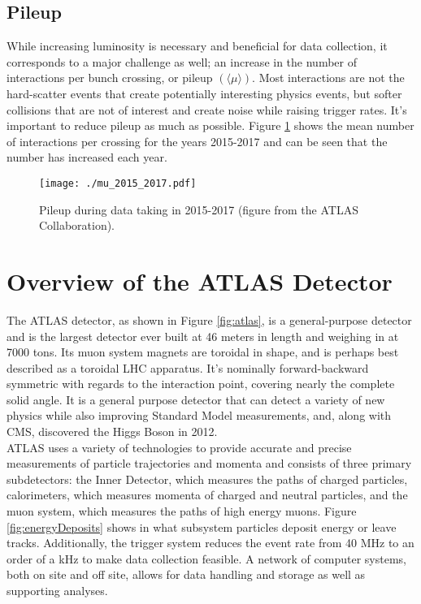
\subsection{Pileup}

While increasing luminosity is necessary and beneficial for data collection, it corresponds to a major challenge as well; an increase in the number of interactions per bunch crossing, or pileup $(\langle \mu \rangle)$.  Most interactions are not the hard-scatter events that create potentially interesting physics events, but softer collisions that are not of interest and create noise while raising trigger rates.  It's important to reduce pileup as much as possible. Figure \ref{fig:mu} shows the mean number of interactions per crossing for the years 2015-2017 and can be seen that the number has increased each year. \\%

\begin{figure}[h!]
  \centering
	\texttt{[image: ./mu\_2015\_2017.pdf]}
\caption[Pileup during data taking in 2015-2017]{\label{fig:mu}{Pileup during data taking in 2015-2017 (figure from the ATLAS Collaboration). }} %
\end{figure}

\section{Overview of the ATLAS Detector}
The ATLAS detector, as shown in Figure \ref{fig:atlas}, is a general-purpose detector and is the largest detector ever built at 46 meters in length and weighing in at 7000 tons.  Its muon system magnets are toroidal in shape, and is perhaps best described as a toroidal LHC apparatus.  It's nominally forward-backward symmetric with regards to the interaction point, covering nearly the complete solid angle.  It is a general purpose detector that can detect a variety of new physics while also improving Standard Model measurements, and, along with CMS, discovered the Higgs Boson in 2012.  \\

ATLAS uses a variety of technologies to provide accurate and precise measurements of particle trajectories and momenta and consists of three primary subdetectors: the Inner Detector, which measures the paths of charged particles, calorimeters, which measures momenta of charged and neutral particles, and the muon system, which measures the paths of high energy muons.   Figure \ref{fig:energyDeposits} shows in what subsystem particles deposit energy or leave tracks.  Additionally, the trigger system reduces the event rate from 40 MHz to an order of a kHz to make data collection feasible.  A network of computer systems, both on site and off site, allows for data handling and storage as well as supporting analyses.\\

